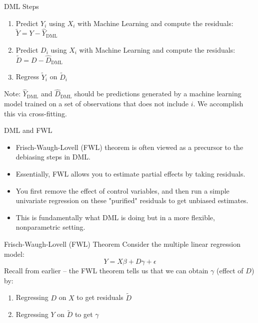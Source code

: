 \documentclass{beamer}
\begin{document}
\begin{frame}{DML Steps}
  \begin{enumerate}
    \item Predict \( Y_i \) using \( X_i \) with Machine Learning and compute the residuals: \( \tilde{Y} = Y - \hat{Y}_{\text{DML}} \)
    \item Predict \( D_i \) using \( X_i \) with Machine Learning and compute the residuals: \( \tilde{D} = D - \hat{D}_{\text{DML}} \)
    \item Regress \( \tilde{Y}_i \) on \( \tilde{D}_i \)
  \end{enumerate}
  Note: \( \hat{Y}_{\text{DML}} \) and \( \hat{D}_{\text{DML}} \) should be predictions generated by a machine learning model trained on a set of observations that does not include \( i \). We accomplish this via cross-fitting.
\end{frame}

\begin{frame}{DML and FWL}


\begin{itemize}
\item Frisch-Waugh-Lovell (FWL) theorem is often viewed as a precursor to the debiasing steps in DML. 
\item Essentially, FWL allows you to estimate partial effects by taking residuals. 
\item You first remove the effect of control variables, and then run a simple univariate regression on these "purified" residuals to get unbiased estimates. 
\item This is fundamentally what DML is doing but in a more flexible, nonparametric setting.
\end{itemize}

\end{frame}

\begin{frame}{Frisch-Waugh-Lovell (FWL) Theorem}
  Consider the multiple linear regression model:
  \[
    Y = X \beta + D \gamma + \epsilon
  \]
  Recall from earlier -- the FWL theorem tells us that we can obtain \( \gamma \) (effect of \( D \)) by:
  \begin{enumerate}
    \item Regressing \( D \) on \( X \) to get residuals \( \tilde{D} \)
    \item Regressing \( {Y} \) on \( \tilde{D} \) to get \( \gamma \)
  \end{enumerate}
\end{frame}
\end{document}
